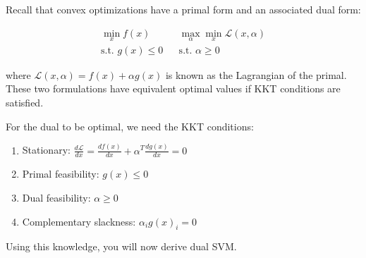 Recall that convex optimizations have a primal form and an associated dual form:

\begin{align*}
\min_{x} f(x) && \max_{\alpha} \min_{x} \mathcal{L}(x, \alpha)\\
\text{s.t. } g(x) \leq 0 && \text{s.t. } \alpha \geq 0
\end{align*}

where $\mathcal{L}(x, \alpha) = f(x) + \alpha g(x)$ is known as the Lagrangian of the primal. These two formulations have equivalent optimal values if KKT conditions are satisfied.

For the dual to be optimal, we need the KKT conditions:

\begin{enumerate}
\item Stationary: $\frac{d\mathcal{L}}{dx} = \frac{df(x)}{dx} + \alpha^T \frac{dg(x)}{dx} = 0$
\item Primal feasibility: $g(x) \leq 0$
\item Dual feasibility: $\alpha \geq 0$
\item Complementary slackness: $\alpha_i g(x)_i = 0$
\end{enumerate}

Using this knowledge, you will now derive dual SVM.

